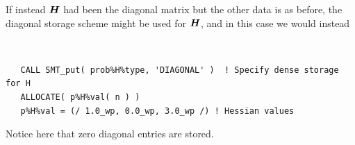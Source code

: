 \documentclass{galahad}
\begin{document}
If instead ${\bm{H}}$ had been the diagonal matrix
but the other data is as before, the diagonal storage scheme 
might be used for ${\bm{H}}$, and in this case we would instead 
{\tt \small
\begin{verbatim}
   CALL SMT_put( prob%H%type, 'DIAGONAL' )  ! Specify dense storage for H
   ALLOCATE( p%H%val( n ) )
   p%H%val = (/ 1.0_wp, 0.0_wp, 3.0_wp /) ! Hessian values
\end{verbatim}
}
\noindent
Notice here that zero diagonal entries are stored.
\end{document}
